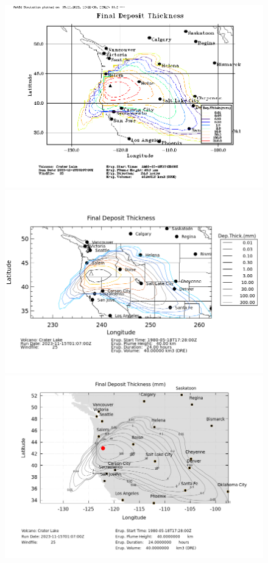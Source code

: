 \begin{figure}[htbp]
\includegraphics[angle=0,scale=0.25]{Figures/Ash3d_Deposit____final_dislin.png}
\includegraphics[angle=0,scale=0.25]{Figures/Ash3d_Deposit____final_plplot.png}
\includegraphics[angle=0,scale=0.25]{Figures/Ash3d_Deposit____final_gnuplot.png}

\end{figure}
